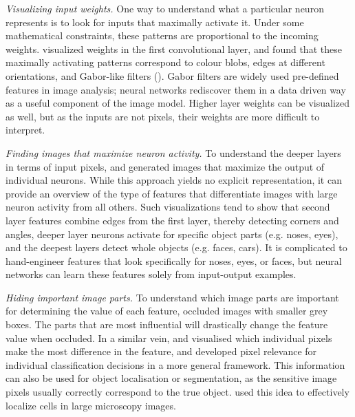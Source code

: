 \textit{Visualizing input weights.} One way to understand what a particular neuron represents is to look for inputs that maximally activate it. Under some mathematical constraints, these patterns are proportional to the incoming weights. \citet{krizhevsky_imagenet_2012} visualized weights in the first convolutional layer, and found that these maximally activating patterns correspond to colour blobs, edges at different orientations, and Gabor-like filters (). Gabor filters are widely used pre-defined features in image analysis; neural networks rediscover them in a data driven way as a useful component of the image model. Higher layer weights can be visualized as well, but as the inputs are not pixels, their weights are more difficult to interpret.

\textit{Finding images that maximize neuron activity.} To understand the deeper layers in terms of input pixels, \citet{girshick_rich_2014} and \citet{simonyan_deep_2013} generated images that maximize the output of individual neurons. While this approach yields no explicit representation, it can provide an overview of the type of features that differentiate images with large neuron activity from all others.  Such visualizations tend to show that second layer features combine edges from the first layer, thereby detecting corners and angles, deeper layer neurons activate for specific object parts (e.g. noses, eyes), and the deepest layers detect whole objects (e.g. faces, cars). It is complicated to hand-engineer features that look specifically for noses, eyes, or faces, but neural networks can learn these features solely from input-output examples.

\textit{Hiding important image parts.} To understand which image parts are important for determining the value of each feature, \citet{zeiler_visualizing_2014-1} occluded images with smaller grey boxes. The parts that are most influential will drastically change the feature value when occluded. In a similar vein, \citet{simonyan_deep_2013} and \citet{springenberg_striving_2014} visualised which individual pixels make the most difference in the feature, and \citet{bach_pixel-wise_2015} developed pixel relevance for individual classification decisions in a more general framework. This information can also be used for object localisation or segmentation, as the sensitive image pixels usually correctly correspond to the true object. \citet{kraus_classifying_2015} used this idea to effectively localize cells in large microscopy images.

